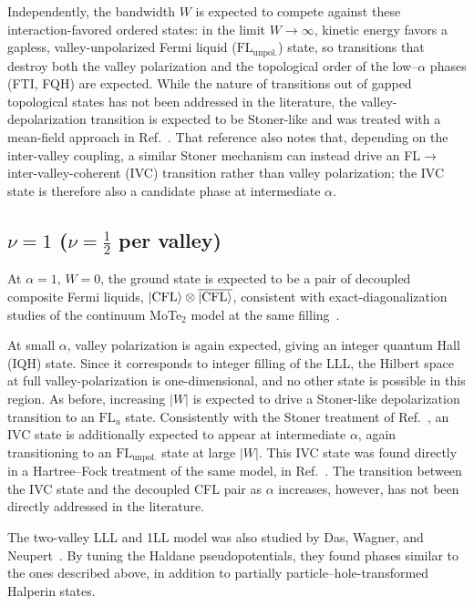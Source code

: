 Independently, the bandwidth $W$ is expected to compete against these interaction-favored ordered states: in the limit $W \to \infty$, kinetic energy favors a gapless, valley-unpolarized Fermi liquid ($\mathrm{FL}_{\text{unpol.}}$) state, so transitions that destroy both the valley polarization and the topological order of the low--$\alpha$ phases (FTI, FQH) are expected. While the nature of transitions out of gapped topological states has not been addressed in the literature, the valley-depolarization transition is expected to be Stoner-like and was treated with a mean-field approach in Ref.~\cite{raines2024unconventional}. That reference also notes that, depending on the inter-valley coupling, a similar Stoner mechanism can instead drive an FL$\to$inter-valley-coherent (IVC) transition rather than valley polarization; the IVC state is therefore also a candidate phase at intermediate $\alpha$.

\subsection{\texorpdfstring{$\nu = 1$}{nu = 1} (\texorpdfstring{$\nu=\frac{1}{2}$}{nu = 1/2} per valley)}

At $\alpha = 1$, $W = 0$, the ground state is expected to be a pair of decoupled composite Fermi liquids, $\ket{\text{CFL}} \otimes \overline{\ket{\text{CFL}}}$, consistent with exact-diagonalization studies of the continuum MoTe$_2$ model at the same filling~\cite{dong2023composite}.

At small $\alpha$, valley polarization is again expected, giving an integer quantum Hall (IQH) state. Since it corresponds to integer filling of the LLL, the Hilbert space at full valley-polarization is one-dimensional, and no other state is possible in this region. As before, increasing $|W|$ is expected to drive a Stoner-like depolarization transition to an $\mathrm{FL}_u$ state. Consistently with the Stoner treatment of Ref.~\cite{raines2024unconventional}, an IVC state is additionally expected to appear at intermediate $\alpha$, again transitioning to an $\mathrm{FL}_\mathrm{unpol.}$ state at large $|W|$. This IVC state was found directly in a Hartree--Fock treatment of the same model, in Ref.~\cite{kwan2025textured}. The transition between the IVC state and the decoupled CFL pair as $\alpha$ increases, however, has not been directly addressed in the literature. %

The two-valley LLL and 1LL model was also studied by Das, Wagner, and Neupert~\cite{das2025fractional}. By tuning the Haldane pseudopotentials, they found phases similar to the ones described above, in addition to partially particle--hole-transformed Halperin states. %

